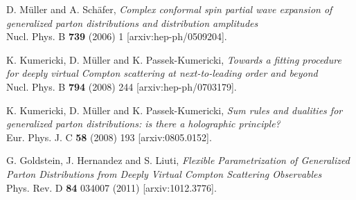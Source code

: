 \documentclass[11pt,a4paper]{article}
\begin{document}
\begin{thebibliography}{10}
D. M\"uller and A. Sch\"afer, \emph{Complex conformal spin partial wave expansion of generalized parton distributions and distribution amplitudes}
\\Nucl. Phys. B {\bf 739} (2006) 1 [arxiv:hep-ph/0509204].

K. Kumericki, D. M\"uller and K. Passek-Kumericki, \emph{Towards a fitting procedure for deeply virtual Compton scattering at next-to-leading order and beyond}
\\Nucl. Phys. B \textbf{794} (2008) 244 [arxiv:hep-ph/0703179].

K. Kumericki, D. M\"uller and K. Passek-Kumericki, \emph{Sum rules and dualities for generalized parton distributions: is there a holographic principle?}
\\Eur. Phys. J. C \textbf{58} (2008) 193 [arxiv:0805.0152].

G. Goldstein, J. Hernandez and S. Liuti, \emph{Flexible Parametrization of Generalized Parton Distributions from Deeply Virtual Compton Scattering Observables}
\\Phys. Rev. D {\bf 84} 034007 (2011) [arxiv:1012.3776].

\end{thebibliography}
\end{document}
